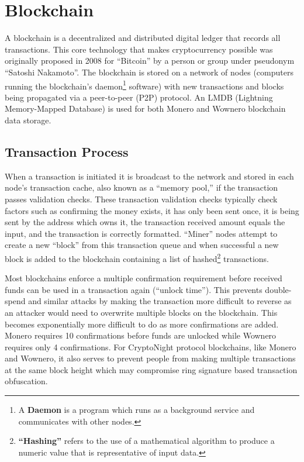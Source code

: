 \section{Blockchain}
A blockchain is a decentralized and distributed digital ledger that records all transactions\cite{moneropedia}. This core technology that makes cryptocurrency possible was originally proposed in 2008 for ``Bitcoin'' by a person or group under pseudonym ``Satoshi Nakamoto''\cite{bitcoin_whitepaper}. The blockchain is stored on a network of nodes (computers running the blockchain's daemon\footnote{A \textbf{Daemon} is a program which runs as a background service and communicates with other nodes.} software) with new transactions and blocks being propagated via a peer-to-peer (P2P) protocol\cite{ledger_transactions}. An LMDB (Lightning Memory-Mapped Database) is used for both Monero and Wownero blockchain data storage\cite{monero_repo,wowrepo}.

\subsection{Transaction Process}
When a transaction is initiated it is broadcast to the network and stored in each node's transaction cache, also known as a ``memory pool,'' if the transaction passes validation checks\cite{ledger_transactions}. These transaction validation checks typically check factors such as confirming the money exists, it has only been sent once, it is being sent by the address which owns it, the transaction received amount equals the input, and the transaction is correctly formatted\cite{zero2monero}.
``Miner'' nodes attempt to create a new ``block'' from this transaction queue and when successful a new block is added to the blockchain\cite{ledger_transactions} containing a list of hashed\footnote{\textbf{``Hashing''} refers to the use of a mathematical algorithm to produce a numeric value that is representative of input data\cite{glossary}.} transactions.

Most blockchains enforce a multiple confirmation requirement before received funds can be used in a transaction again (``unlock time'')\cite{wikipedia_crypto}. This prevents double-spend and similar attacks by making the transaction more difficult to reverse as an attacker would need to overwrite multiple blocks on the blockchain. This becomes exponentially more difficult to do as more confirmations are added. Monero requires 10 confirmations\cite{monero_transactiontime} before funds are unlocked while Wownero requires only 4 confirmations\cite{wowrepo}. For CryptoNight protocol blockchains, like Monero and Wownero, it also serves to prevent people from making multiple transactions at the same block height which may compromise ring signature based transaction obfuscation.

